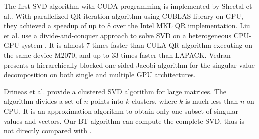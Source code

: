 The first SVD algorithm with CUDA programming is implemented by Sheetal et al.\cite{09IPDPSQR}. With parallelized QR iteration algorithm using CUBLAS library on GPU, they achieved a speedup of up to 8 over the Intel MKL QR implementation.
Liu et al. use a divide-and-conquer approach to solve SVD on a heterogeneous CPU-GPU system \cite{13CFDC}.
It is almost 7 times faster than CULA QR algorithm executing on the same device M2070, and up to 33 times faster than LAPACK.
Vedran\cite{14arxivjacobi} presents a hierarchically blocked one-sided Jacobi algorithm for the singular value decomposition on both single and multiple GPU architectures. 

Drineas et al. \cite{99clustering} provide a clustered SVD algorithm for large matrices. The algorithm divides a set of $n$ points into $k$ clusters, where $k$ is much less than $n$ on CPU.
It is an approximation algorithm to obtain only one subset of singular values
and vectors. Our BT algorithm can compute the complete SVD, thus is not
directly compared with \cite{99clustering}. 

